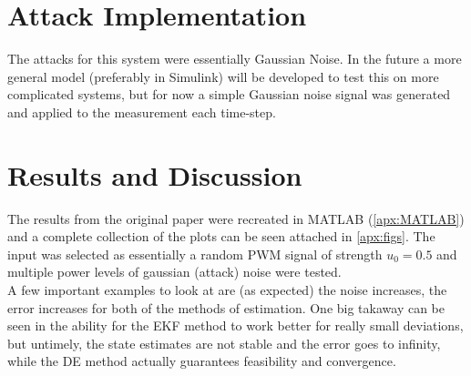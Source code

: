 \documentclass[]{ieeetran}
\begin{document}
\section{Attack Implementation}
The attacks for this system were essentially Gaussian Noise. In the future a more general model (preferably in Simulink) will be developed to test this on more complicated systems, but for now a simple Gaussian noise signal was generated and applied to the measurement each time-step.

\section{Results and Discussion}
The results from the original paper were recreated in MATLAB (\appendixname \ref{apx:MATLAB}) and a complete collection of the plots can be seen attached in \appendixname \ref{apx:figs}. The input was selected as essentially a random PWM signal of strength $u_0 = 0.5$ and multiple power levels of gaussian (attack) noise were tested.\\
A few important examples to look at are (as expected) the noise increases, the error increases for both of the methods of estimation. One big takaway can be seen in the ability for the EKF method to work better for really small deviations, but untimely, the state estimates are not stable and the error goes to infinity, while the DE method actually guarantees feasibility and convergence.





%
%
%
\end{document}
